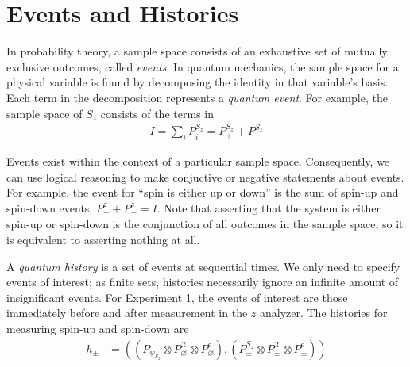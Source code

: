\section{Events and Histories}

%

In probability theory, a sample space consists of an exhaustive set of mutually exclusive outcomes, called \textit{events}. In quantum mechanics, the sample space for a physical variable is found by decomposing the identity in that variable's basis. Each term in the decomposition represents a \textit{quantum event}. For example, the sample space of $S_z$ consists of the terms in
\begin{align}
  I = \sum_i P^{S_z}_i = P^{S_z}_+ + P^{S_z}_-
\end{align}

Events exist within the context of a particular sample space. Consequently, we can  use logical reasoning to make conjuctive or negative statements about events. For example, the event for ``spin is either up or down'' is the sum of spin-up and spin-down events, $P^z_+ + P^z_- = I$. Note that asserting that the system is either spin-up or spin-down is the conjunction of all outcomes in the sample space, so it is equivalent to asserting nothing at all.

A \textit{quantum history} is a set of events at sequential times. We only need to specify events of interest; as finite sets, histories necessarily ignore an infinite amount of insignificant events. For Experiment 1, the events of interest are those immediately before and after measurement in the $z$ analyzer. The histories for measuring spin-up and spin-down are
\begin{align}
  h_\pm &= \left( \left(P_{\psi_{S_z}} \otimes P^\mathcal{X}_\varnothing \otimes P^\epsilon_\varnothing \right), \left(P^{S_z}_\pm \otimes P^\mathcal{X}_\pm \otimes P^\epsilon_\pm \right)  \right)
\end{align}

